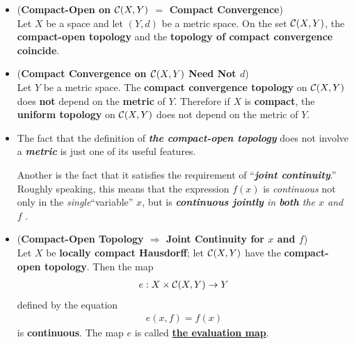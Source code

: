 \documentclass[11pt]{article}
\begin{document}
\begin{itemize}
\item \begin{proposition} (\textbf{Compact-Open on ${\mathcal C}(X, Y)$ $=$ Compact Convergence}) \citep{munkres2000topology}\\
Let $X$ be a space and let $(Y, d)$ be a metric space. On the set ${\mathcal C}(X, Y)$, the \textbf{compact-open topology} and the \textbf{topology of compact convergence} \textbf{coincide}.
\end{proposition}

\item \begin{corollary}(\textbf{Compact Convergence on ${\mathcal C}(X, Y)$ Need Not $d$}) \citep{munkres2000topology}\\
Let $Y$ be a metric space. The \textbf{compact convergence topology} on ${\mathcal C}(X, Y)$ does  \textbf{not} depend on the \textbf{metric} of $Y$. Therefore if $X$ is \textbf{compact}, the \textbf{uniform topology} on ${\mathcal C}(X, Y)$ does not depend on the metric of $Y$.
\end{corollary}

\item \begin{remark} 
The fact that the definition of \emph{\textbf{the compact-open topology}} does not involve a \emph{\textbf{metric}} is just one of its useful features. 

Another is the fact that it satisfies the requirement of ``\emph{\textbf{joint continuity}}.” Roughly speaking, this means that the expression $f(x)$ is
\emph{continuous} not only in the \emph{single}``variable”  $x$, but is \emph{\textbf{continuous jointly} in \textbf{both} the $x$ and $f$} .
\end{remark}

\item \begin{theorem} (\textbf{Compact-Open Topology $\Rightarrow$ Joint Continuity for $x$ and $f$})\\
Let $X$ be \textbf{locally compact Hausdorff}; let ${\mathcal C}(X, Y)$ have the \textbf{compact-open topology}. Then the map
\begin{align*}
e: X \times {\mathcal C}(X, Y) \rightarrow Y
\end{align*}
defined by the equation
\begin{align*}
e(x, f) = f(x)
\end{align*}
is \textbf{continuous}. The map $e$ is called \underline{\textbf{the evaluation map}}.
\end{theorem}


\end{itemize}
\end{document}
